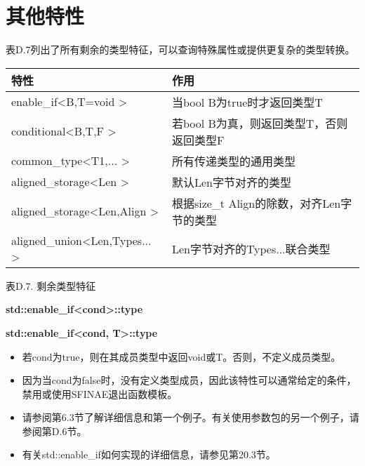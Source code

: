 \section{其他特性}


表D.7列出了所有剩余的类型特征，可以查询特殊属性或提供更复杂的类型转换。

\begin{table}[H]
	\begin{center}
	\begin{tabular}{l|l}
		\hline
		\textbf{特性}                                       & \textbf{作用}                                                   \\ \hline
		enable\_if\textless{}B,T=void \textgreater{}         & 当bool B为true时才返回类型T                              \\ \hline
		conditional\textless{}B,T,F \textgreater{}           & 若bool B为真，则返回类型T，否则返回类型F              \\ \hline
		common\_type\textless{}T1,... \textgreater{}         & 所有传递类型的通用类型                                   \\ \hline
		aligned\_storage\textless{}Len \textgreater{}        & 默认Len字节对齐的类型                          \\ \hline
		aligned\_storage\textless{}Len,Align \textgreater{}  & 根据size\_t Align的除数，对齐Len字节的类型 \\ \hline
		aligned\_union\textless{}Len,Types... \textgreater{} & Len字节对齐的Types...联合类型                 \\ \hline
	\end{tabular}
	\end{center}
\end{table}

\begin{center}
表D.7. 剩余类型特征
\end{center}

\textbf{std::enable\_if<cond>::type}

\textbf{std::enable\_if<cond, T>::type}

\begin{itemize}
\item
若cond为true，则在其成员类型中返回void或T。否则，不定义成员类型。

\item
因为当cond为false时，没有定义类型成员，因此该特性可以通常给定的条件，禁用或使用SFINAE退出函数模板。

\item
请参阅第6.3节了解详细信息和第一个例子。有关使用参数包的另一个例子，请参阅第D.6节。

\item
有关std::enable\_if如何实现的详细信息，请参见第20.3节。
\end{itemize}

